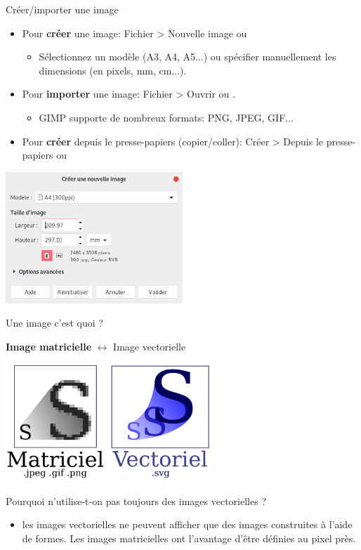 \begin{frame}{Créer/importer une image}
	\begin{itemize}
		\item Pour \textbf{créer} une image: Fichier > Nouvelle image ou 
			\begin{itemize}
				\item Sélectionnez un modèle (A3, A4, A5...) ou spécifier manuellement les dimensions (en pixels, mm, cm...).
			\end{itemize}
		\item Pour \textbf{importer} une image: Fichier  > Ouvrir ou .
			\begin{itemize}
				\item GIMP supporte de nombreux formats: PNG, JPEG, GIF...
			\end{itemize}
		\item Pour \textbf{créer} depuis le presse-papiers (copier/coller): Créer > Depuis le presse-papiers ou 
	\end{itemize}
	\begin{center}
		\includegraphics[width=0.5\textwidth]{Images/new_image.png}
	\end{center}
\end{frame}

\begin{frame}{Une image c'est quoi ?}
	\begin{center}
		\textbf{Image matricielle} $\leftrightarrow$ Image vectorielle
		\includegraphics[width=0.6\textwidth]{Images/mat_vs_vec}
	\end{center}
	Pourquoi n'utilise-t-on pas toujours des images vectorielles ?
	\begin{itemize}
		\item les images vectorielles ne peuvent afficher que des images construites à l'aide de formes. Les images matricielles ont l'avantage d'être définies au pixel près.
	\end{itemize}
\end{frame}

